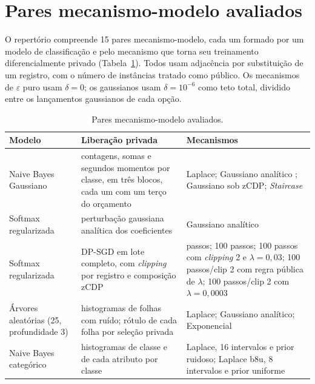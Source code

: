 \section{Pares mecanismo-modelo avaliados}
\label{sec:mecanismos}

O repertório compreende 15 pares mecanismo-modelo, cada um formado por um modelo de classificação e pelo mecanismo que torna seu treinamento diferencialmente privado (Tabela~\ref{tab:opcoes}). Todos usam adjacência por substituição de um registro, com o número de instâncias tratado como público. Os mecanismos de $\varepsilon$ puro usam $\delta = 0$; os gaussianos usam $\delta = 10^{-6}$ como teto total, dividido entre os lançamentos gaussianos de cada opção.

\begin{table}[htb]
\centering
\caption{Pares mecanismo-modelo avaliados.}
\label{tab:opcoes}
\small
\begin{tabular}{>{\raggedright\arraybackslash}p{3.2cm}>{\raggedright\arraybackslash}p{6.2cm}>{\raggedright\arraybackslash}p{4.8cm}}
\toprule
\textbf{Modelo} & \textbf{Liberação privada} & \textbf{Mecanismos} \\
\midrule
Naive Bayes Gaussiano & contagens, somas e segundos momentos por classe, em três blocos, cada um com um terço do orçamento & Laplace; Gaussiano analítico \cite{ref21}; Gaussiano sob zCDP; \textit{Staircase} \cite{ref22} \\ \addlinespace
Softmax regularizada & perturbação gaussiana analítica dos coeficientes \cite{ref57} & Gaussiano analítico \\ \addlinespace
Softmax regularizada & DP-SGD em lote completo, com \textit{clipping} por registro e composição zCDP \cite{ref47} & 25 passos; 100 passos; 100 passos com \textit{clipping} 2 e $\lambda = 0{,}03$; 100 passos/clip 2 com regra pública de $\lambda$; 100 passos/clip 2 com $\lambda=0{,}0003$ \\ \addlinespace
Árvores aleatórias (25, profundidade 3) & histogramas de folhas com ruído; rótulo de cada folha por seleção privada & Laplace; Gaussiano analítico; Exponencial \cite{ref30} \\ \addlinespace
Naive Bayes categórico & histogramas de classe e de cada atributo por classe & Laplace, 16 intervalos e prior ruidoso; Laplace b8u, 8 intervalos e prior uniforme \\
\bottomrule
\end{tabular}
\par{}
\end{table}

